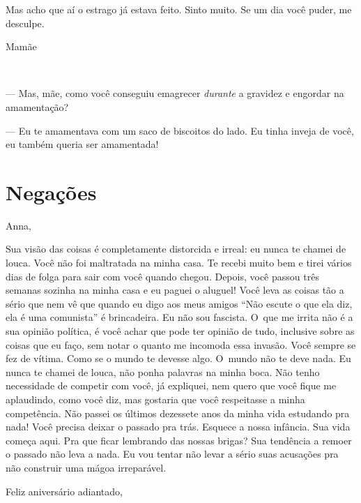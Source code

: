 Mas acho que aí o estrago já estava feito. Sinto muito. Se um dia você
puder, me desculpe.

\begin{flushright}Mamãe\end{flushright}


​\pagebreak\mbox{} 

\vspace*{.3\textheight} 

--- Mas, mãe, como você conseguiu emagrecer \emph{durante} a gravidez e
engordar na amamentação?

--- Eu te amamentava com um saco de biscoitos do lado. Eu tinha inveja
de você, eu também queria ser amamentada!

\chapter{Negações}

\vspace{-3em} 

Anna,

\smallskip{} 

Sua visão das coisas é completamente distorcida e irreal: eu nunca te
chamei de louca. Você não foi maltratada na minha casa. Te recebi muito
bem e tirei vários dias de folga para sair com você quando chegou.
Depois, você passou três semanas sozinha na minha casa e eu paguei o
aluguel! Você leva as coisas tão a sério que nem vê que quando eu digo
aos meus amigos ``Não escute o que ela diz, ela é uma comunista'' é
brincadeira. Eu não sou fascista. O~que me irrita não é a sua opinião
política, é você achar que pode ter opinião de tudo, inclusive sobre as
coisas que eu faço, sem notar o quanto me incomoda essa invasão. Você
sempre se fez de vítima. Como se o mundo te devesse algo. O~mundo não te
deve nada. Eu nunca te chamei de louca, não ponha palavras na minha
boca. Não tenho necessidade de competir com você, já expliquei, nem
quero que você fique me aplaudindo, como você diz, mas gostaria que você
respeitasse a minha competência. Não passei os últimos dezessete anos da
minha vida estudando pra nada! Você precisa deixar o passado pra trás.
Esquece a nossa infância. Sua vida começa aqui. Pra que ficar lembrando
das nossas brigas? Sua tendência a remoer o passado não leva a nada. Eu
vou tentar não levar a sério suas acusações pra não construir uma mágoa
irreparável.

\smallskip{}  \begin{flushright}Feliz aniversário adiantado,\end{flushright}

